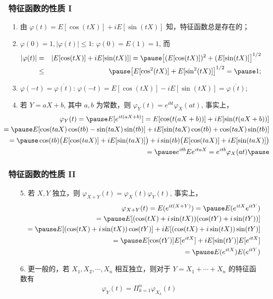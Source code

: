 \begin{frame}%
	\frametitle{特征函数的性质 I}
	\begin{enumerate}[<+-|alert@+>]
		\item  由 $\varphi (t)=E[\cos (tX)]+iE[\sin (tX)]$ 知，特征函数总是存在的；
		\item $\varphi (0)=1, |\varphi (t)|\le 1$: $\varphi (0)=E (1)=1$, 而
		\begin{eqnarray*}
			|\varphi(t)|&=&|E[\cos(tX)]+iE[\sin(tX)]|=\pause \big[(E[\cos(tX)])^2+(E[\sin(tX)]\big]^{1/2}\\
			&\le&\pause \big[E[\cos^2(tX)]+E[\sin^2(tX)]\big]^{1/2}=\pause 1;
		\end{eqnarray*}
		\item $\varphi(-t)=\overline{\varphi(t)}$: $\varphi(-t)=E[\cos(tX)]-iE[\sin(tX)]=\overline{\varphi(t)}$;
		\item  若 $Y=aX+b$, 其中 $a,b$ 为常数，则 $\varphi_Y (t)=e^{ibt}\varphi_X (at)$, 事实上，
		{\small\begin{eqnarray*}
				&&\hspace{-1.2cm}\varphi_Y(t)=\pause E[e^{it(aX+b)}]=E[\cos(t(aX+b))]+iE[\sin(t(aX+b))]\\
				&&\hspace{-1.2cm}=\pause E[\cos(taX)\cos(tb)-\sin(taX)\sin(tb)]+iE[\sin(taX)\cos(tb)+\cos(taX)\sin(tb)]\\
				&&\hspace{-1.2cm}=\pause \cos(tb)\big(E[\cos(taX)]+iE[\sin(taX)]\big)+i\sin(tb)\big(E[\cos(taX)]+iE[\sin(taX)]\big)\\
				&&\hspace{-1.2cm}=\pause  e^{itb}Ee^{itaX}=e^{itb}\varphi_X(at)\pause
		\end{eqnarray*}}
	\end{enumerate}
\end{frame}
\begin{frame}
	\frametitle{特征函数的性质 II}

	\begin{enumerate}[<+-|alert@+>]
		\item[5.] 若 $X,Y$ 独立，则 $\varphi_{X+Y}(t)=\varphi_X (t)\varphi_Y (t)$, 事实上，
		\begin{eqnarray*}
			&&\varphi_{X+Y}(t)=E(e^{it(X+Y)})=\pause E(e^{itX}e^{itY})\\
			&&=\pause E[(\cos(tX)+i\sin(tX))(\cos(tY)+i\sin(tY))]\\
			&&=\pause E[(\cos(tX)+i\sin(tX))\cos(tY)]+iE[(\cos(tX)+i\sin(tX))\sin(tY)]\\
			&&=\pause E[\cos(tY)]E[e^{itX}]+iE[\sin(tY)]E[e^{itX}]\\
			&&=\pause E(e^{itX})E(e^{itY})
		\end{eqnarray*}\pause
		\item[6.] 更一般的，若 $X_1,X_2,\cdots,X_n$ 相互独立，则对于 $Y=X_1+\cdots+X_n$ 的特征函数有
		\begin{eqnarray*}
			\varphi_Y(t)=\Pi_{k=1}^n\varphi_{X_k}(t)
		\end{eqnarray*}
	\end{enumerate}
\end{frame}
